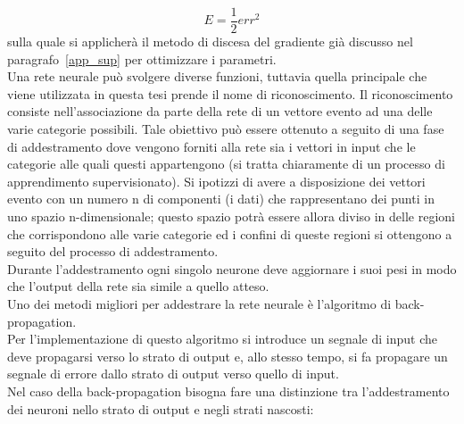 \begin{equation}
E = \frac{1}{2}err^2
\end{equation}
sulla quale si applicherà il metodo di discesa del gradiente già discusso nel paragrafo~\ref{app_sup} per ottimizzare i parametri.\\
Una rete neurale può svolgere diverse funzioni, tuttavia quella principale che viene utilizzata in questa tesi prende il nome di riconoscimento. Il riconoscimento consiste nell'associazione da parte della rete di un vettore evento ad una delle varie categorie possibili. Tale obiettivo può essere ottenuto a seguito di una fase di addestramento dove vengono forniti alla rete sia i vettori in input che le categorie alle quali questi appartengono (si tratta chiaramente di un processo di apprendimento supervisionato). Si ipotizzi di avere a disposizione dei vettori evento con un numero n di componenti (i dati) che rappresentano dei punti in uno spazio n-dimensionale; questo spazio potrà essere allora diviso in delle regioni che corrispondono alle varie categorie ed i confini di queste regioni si ottengono a seguito del processo di addestramento. \\
Durante l'addestramento ogni singolo neurone deve aggiornare i suoi pesi in modo che l'output della rete sia simile a quello atteso. \\
Uno dei metodi migliori per addestrare la rete neurale è l'algoritmo di back-propagation. \\
Per l'implementazione di questo algoritmo si introduce un segnale di input che deve propagarsi verso lo strato di output e, allo stesso tempo, si fa propagare un segnale di errore dallo strato di output verso quello di input.\\
Nel caso della back-propagation bisogna fare una distinzione tra l'addestramento dei neuroni nello strato di output e negli strati nascosti:
